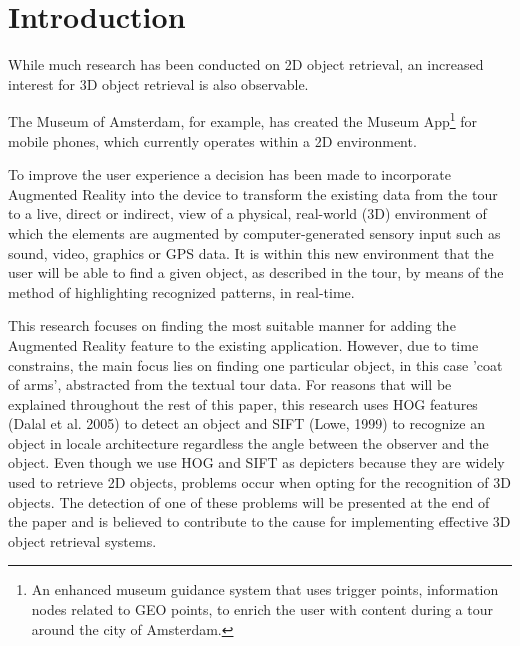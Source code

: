 \documentclass[12pt ]{article}
\begin{document}
\maketitle

\begin{abstract}
\end{abstract}
\section{Introduction}
While much research has been conducted on 2D object retrieval, an increased interest for 3D object retrieval is also observable.

The Museum of Amsterdam, for example, has created the Museum App\footnote{An enhanced museum guidance system that uses trigger points, information nodes related to GEO points, to enrich the user with content during a tour around the city of Amsterdam.} for mobile phones, which currently operates within a 2D environment. 

To improve the user experience a decision has been made to incorporate Augmented Reality into the device to transform the existing data from the tour to a live, direct or indirect, view of a physical, real-world (3D) environment of which the elements are augmented by computer-generated sensory input such as sound, video, graphics or GPS data. It is within this new environment that the user will be able to find a given object, as described in the tour, by means of the method of highlighting recognized patterns, in real-time.

This research focuses on finding the most suitable manner for adding the Augmented Reality feature to the existing application. However, due to time constrains, the main focus lies on finding one particular object, in this case 'coat of arms', abstracted from the textual tour data. For reasons that will be explained throughout the rest of this paper, this research uses HOG features (Dalal et al. 2005) to detect an object and SIFT (Lowe, 1999) to recognize an object in locale architecture regardless the angle between the observer and the object.  Even though we use HOG and SIFT as depicters because they are widely used to retrieve 2D objects, problems occur when opting for the recognition of  3D objects. The detection of one of these problems will be presented at the end of the paper and is believed to contribute to the cause for implementing effective 3D object retrieval systems.
\end{document}
